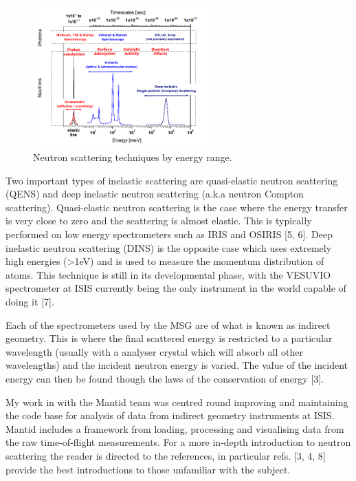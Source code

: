 \documentclass[paper=a4, fontsize=11pt]{scrartcl}	%
\numberwithin{equation}{section}															%
\numberwithin{figure}{section}																%
\numberwithin{table}{section}
\begin{document}
\begin{figure}[H]
\centering
\includegraphics[width=0.6\textwidth]{img/instrument-energy-chart.png}
\caption{Neutron scattering techniques by energy range.}
\label{fig:instrument-energy-chart}
\end{figure}

Two important types of inelastic scattering are quasi-elastic neutron
scattering (QENS) and deep inelastic neutron scattering (a.k.a neutron
Compton scattering). Quasi-elastic neutron scattering is the case where
the energy transfer is very close to zero and the scattering is almost
elastic. This is typically performed on low energy spectrometers such as
IRIS and OSIRIS {[}5, 6{]}. Deep inelastic neutron scattering (DINS) is
the opposite case which uses extremely high energies (\textgreater{}1eV)
and is used to measure the momentum distribution of atoms. This
technique is still in its developmental phase, with the VESUVIO
spectrometer at ISIS currently being the only instrument in the world
capable of doing it {[}7{]}.

Each of the spectrometers used by the MSG are of what is known as
indirect geometry. This is where the final scattered energy is
restricted to a particular wavelength (usually with a analyser crystal
which will absorb all other wavelengths) and the incident neutron energy
is varied. The value of the incident energy can then be found though the
laws of the conservation of energy {[}3{]}.

My work in with the Mantid team was centred round improving and
maintaining the code base for analysis of data from indirect geometry
instruments at ISIS. Mantid includes a framework from loading,
processing and visualising data from the raw time-of-flight
measurements. For a more in-depth introduction to neutron scattering the
reader is directed to the references, in particular refs. {[}3, 4, 8{]}
provide the best introductions to those unfamiliar with the subject.
\end{document}
